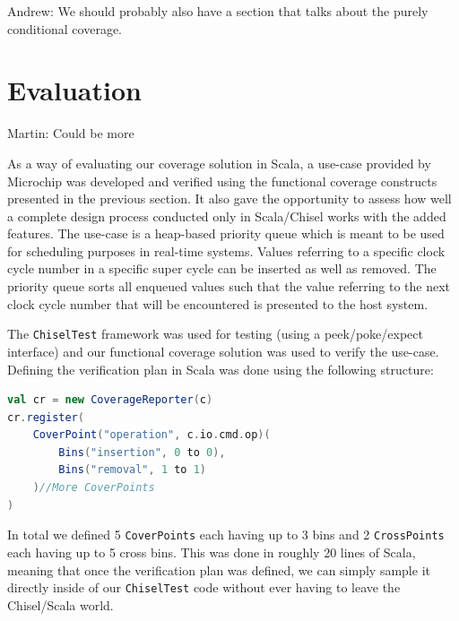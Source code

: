 \documentclass[conference]{IEEEtran}
\newcommand{\martin}[1]{{\color{blue} Martin: #1}}
\newcommand{\andrew}[1]{{\color{red} Andrew: #1}}
\begin{document}
\andrew{We should probably also have a section that talks about the purely conditional coverage.}


\section{Evaluation}

\martin{Could be more}

As a way of evaluating our coverage solution in Scala, a use-case provided by Microchip was developed and verified using the functional coverage constructs presented in the previous section. It also gave the opportunity to assess how well a complete design process conducted only in Scala/Chisel works with the added features. The use-case is a heap-based priority queue which is meant to be used for scheduling purposes in real-time systems. Values referring to a specific clock cycle number in a specific super cycle can be inserted as well as removed. The priority queue sorts all enqueued values such that the value referring to the next clock cycle number that will be encountered is presented to the host system. 

The \texttt{ChiselTest} framework was used for testing (using a peek/poke/expect interface) and our functional coverage solution was used to verify the use-case. Defining the verification plan in Scala was done using the following structure:  
\begin{lstlisting}[language=scala]
val cr = new CoverageReporter(c)
cr.register(
    CoverPoint("operation", c.io.cmd.op)(
        Bins("insertion", 0 to 0),
        Bins("removal", 1 to 1)
    )//More CoverPoints
)
\end{lstlisting}
In total we defined 5 \texttt{CoverPoints} each having up to 3 bins and 2 \texttt{CrossPoints} each having up to 5 cross bins. This was done in roughly 20 lines of Scala, meaning that once the verification plan was defined, we can simply sample it directly inside of our \texttt{ChiselTest} code without ever having to leave the Chisel/Scala world.
\end{document}
